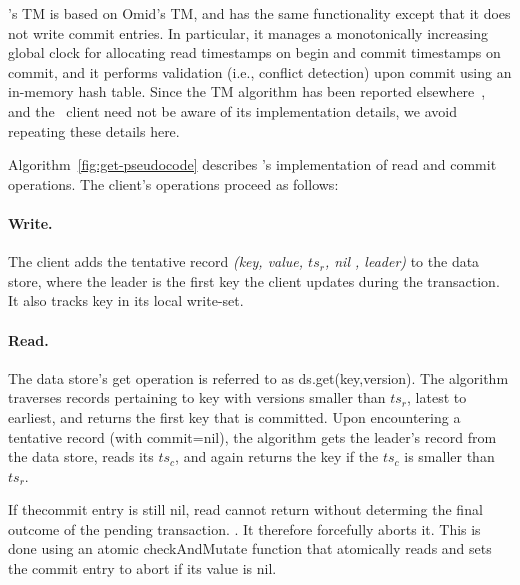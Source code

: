 \sys's TM is based on Omid's TM, and has the same functionality except that it does not write commit entries.
In particular, it manages a monotonically increasing global clock for allocating read timestamps on begin and commit timestamps on commit,
and it performs validation (i.e., conflict detection) upon commit using an in-memory hash table. 
Since the TM algorithm has been reported elsewhere~\cite{omid-fast}, and the \sys\ client need not be aware of 
its implementation details, we avoid repeating these details here. 

Algorithm~\ref{fig:get-pseudocode} describes \sys's implementation of read and commit operations.
The client's operations proceed as follows:

\paragraph{Write.}
The client adds the tentative record \emph{(key, value, $ts_r$, nil , leader)} to the data store, where
the leader is the first key the client updates during the transaction. It also tracks key in its local write-set.

\paragraph{Read.}
The data store's get operation is referred to as ds.get(key,version). The algorithm traverses records pertaining
to key with versions smaller than $ts_r$, latest to earliest, and returns the first key that is committed. Upon
encountering a tentative record (with commit=nil), the algorithm gets the leader's record from the data store,
reads its $ts_c$, and again returns the key if the $ts_c$ is smaller than $ts_r$. 

If thecommit entry is still nil, read cannot return without determing the final outcome
of the pending transaction. . 
It  therefore forcefully aborts it. This is done using an atomic 
 {checkAndMutate} function that atomically reads and sets the commit entry to abort if its value is nil.


